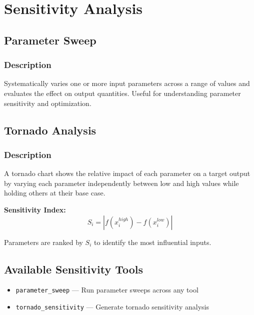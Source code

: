 \documentclass[11pt,a4paper]{article}
\begin{document}
\newpage

\section{Sensitivity Analysis}

\subsection{Parameter Sweep}

\subsubsection{Description}
Systematically varies one or more input parameters across a range of values and evaluates the effect on output quantities. Useful for understanding parameter sensitivity and optimization.

\subsection{Tornado Analysis}

\subsubsection{Description}
A tornado chart shows the relative impact of each parameter on a target output by varying each parameter independently between low and high values while holding others at their base case.

\begin{tcolorbox}[colback=formulabox,colframe=black!75]
\textbf{Sensitivity Index:}
\begin{equation}
S_i = |f(x_i^{high}) - f(x_i^{low})|
\end{equation}

Parameters are ranked by $S_i$ to identify the most influential inputs.
\end{tcolorbox}

\subsection{Available Sensitivity Tools}
\begin{itemize}
\item \texttt{parameter\_sweep} --- Run parameter sweeps across any tool
\item \texttt{tornado\_sensitivity} --- Generate tornado sensitivity analysis
\end{itemize}
\end{document}
